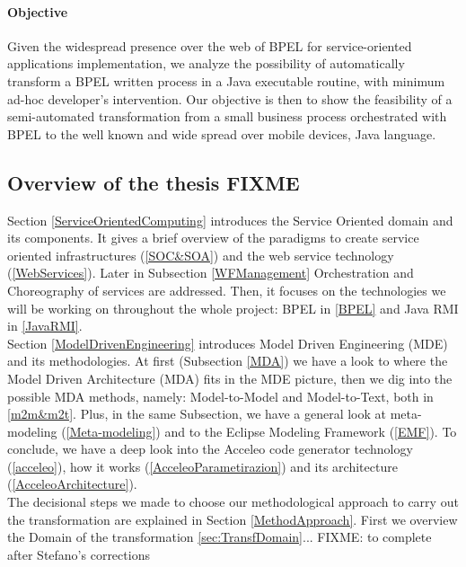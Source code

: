 \paragraph{Objective}
Given the widespread presence over the web of BPEL for service-oriented applications implementation, we analyze the possibility of automatically transform a BPEL written process in a Java executable routine, with minimum ad-hoc developer's intervention.
Our objective is then to show the feasibility of a semi-automated transformation from a small business process orchestrated with BPEL to the well known and wide spread over mobile devices, Java language. 




\subsection{Overview of the thesis FIXME}
Section \ref{ServiceOrientedComputing} introduces the Service Oriented domain and its components. It gives a brief overview of the paradigms to create service oriented infrastructures (\ref{SOC&SOA}) and the web service technology (\ref{WebServices}). Later in Subsection \ref{WFManagement} Orchestration and Choreography of services are addressed. Then, it focuses on the technologies we will be working on throughout the whole project: BPEL in \ref{BPEL} and Java RMI in \ref{JavaRMI}. \\
Section \ref{ModelDrivenEngineering} introduces Model Driven Engineering (MDE) and its methodologies. At first (Subsection \ref{MDA}) we have a look to where the Model Driven Architecture (MDA) fits in the MDE picture, then we dig into the possible MDA methods, namely: Model-to-Model and Model-to-Text, both in \ref{m2m&m2t}. Plus, in the same Subsection, we have a general look at meta-modeling (\ref{Meta-modeling}) and to the Eclipse Modeling Framework (\ref{EMF}). To conclude, we have a deep look into the Acceleo code generator technology (\ref{acceleo}), how it works (\ref{AcceleoParametirazion}) and its architecture (\ref{AcceleoArchitecture}). \\
The decisional steps we made to choose our methodological approach to carry out the transformation are explained in Section \ref{MethodApproach}. First we overview the Domain of the transformation \ref{sec:TransfDomain}...
FIXME: to complete after Stefano's corrections

